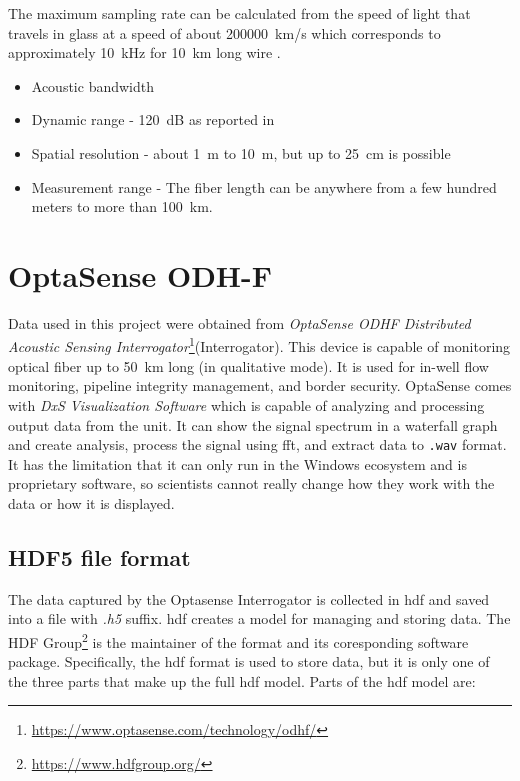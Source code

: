 The maximum sampling rate can be calculated from the speed of light that travels in glass at a speed of about \qty{200000}{\km/\s} which corresponds to approximately \qty{10}{\kHz} for \qty{10}{\km} long wire \cite{WangYu2017RDVM}.


\begin{itemize}
    \item Acoustic bandwidth
    \item Dynamic range - \qty{120}{\dB} as reported in \cite{dasseismic}
    \item Spatial resolution - about \qty{1}{\m} to \qty{10}{\m}, but up to \qty{25}{\cm} is possible
    \item Measurement range - The fiber length can be anywhere from a few hundred meters to more than \qty{100}{\km}.
\end{itemize}



\section{OptaSense ODH-F}

Data used in this project were obtained from \textit{OptaSense ODHF Distributed Acoustic Sensing Interrogator}\footnote{\url{https://www.optasense.com/technology/odhf/}}(Interrogator). This device is capable of monitoring optical fiber up to \qty{50}{\km} long (in qualitative mode). It is used for in-well flow monitoring, pipeline integrity management, and border security. OptaSense comes with \textit{DxS Visualization Software} which is capable of analyzing and processing output data from the unit. It can show the signal spectrum in a waterfall graph and create analysis, process the signal using \ac{fft}, and extract data to \verb|.wav| format. It has the limitation that it can only run in the Windows ecosystem and is proprietary software, so scientists cannot really change how they work with the data or how it is displayed.


\subsection{HDF5 file format}

The data captured by the Optasense Interrogator is collected in \ac{hdf} and saved into a file with \textit{.h5} suffix. \ac{hdf} creates a model for managing and storing data. The HDF Group\footnote{\url{https://www.hdfgroup.org/}} is the maintainer of the format and its coresponding software package. Specifically, the \ac{hdf} format is used to store data, but it is only one of the three parts that make up the full \ac{hdf} model. Parts of the \ac{hdf} model are:

